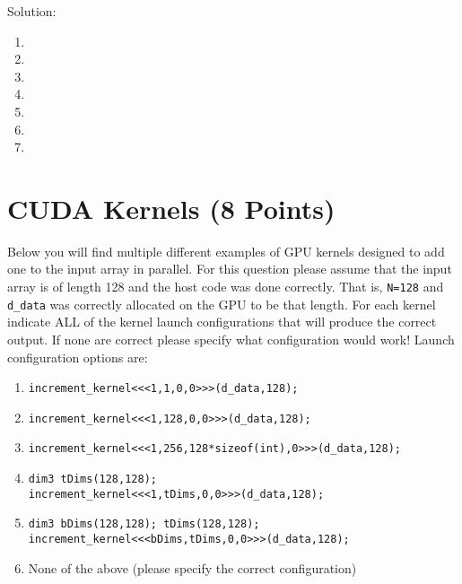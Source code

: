 \documentclass[]{article}
\begin{document}
Solution:
\begin{enumerate}[label=(\alph*)]
    \item %
    
    \item %
    
    \item %
    
    \item %
    
    \item %
    
    \item %
    
    \item %
    
\end{enumerate}

\newpage
\section{CUDA Kernels (8 Points)}
Below you will find multiple different examples of GPU kernels designed to add one to the input array in parallel. For this question please assume that the input array is of length 128 and the host code was done correctly. That is, \texttt{N=128} and \texttt{d\_data} was correctly allocated on the GPU to be that length. For each kernel indicate ALL of the kernel launch configurations that will produce the correct output. If none are correct please specify what configuration would work!
Launch configuration options are:
\begin{tcolorbox}[left=14pt, arc=0pt, outer arc=0pt, colframe=blue!5, colback=blue!5]
\begin{enumerate}[label=\roman*.]
    \item \texttt{increment\_kernel<<<1,1,0,0>>>(d\_data,128);}
    \item \texttt{increment\_kernel<<<1,128,0,0>>>(d\_data,128);}
    \item \texttt{increment\_kernel<<<1,256,128*sizeof(int),0>>>(d\_data,128);}
    \item \texttt{dim3 tDims(128,128);} \\ \texttt{increment\_kernel<<<1,tDims,0,0>>>(d\_data,128);}
    \item \texttt{dim3 bDims(128,128); tDims(128,128);} \\ \texttt{increment\_kernel<<<bDims,tDims,0,0>>>(d\_data,128);}
    \item None of the above (please specify the correct configuration)
\end{enumerate}
\end{tcolorbox}
\end{document}
